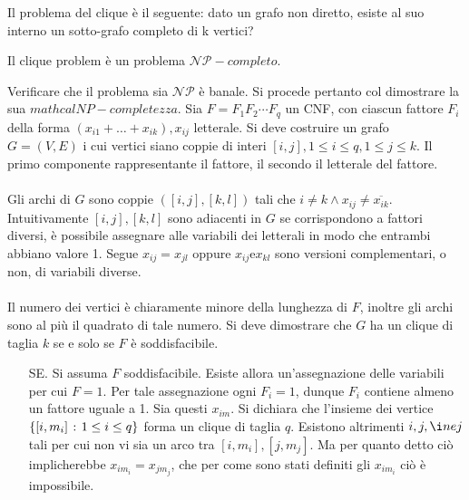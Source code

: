 \documentclass{subfiles}
\begin{document}
Il problema del clique è il seguente: dato un grafo non diretto, esiste al suo interno un sotto-grafo completo di k vertici?

\begin{Theorem}
    Il clique problem è un problema \(\mathcal{NP}-completo\).

    \begin{Proof*}
        Verificare che il problema sia \(\mathcal{NP}\) è banale.
        Si procede pertanto col dimostrare la sua \(mathcal{NP}-completezza\).
        Sia \(F = F_{1}F_{2} \cdots F_{q}\) un CNF, con ciascun fattore \(F_{i}\) della forma \((x_{i1} + \ldots + x_{ik}), x_{ij}\) letterale.
        Si deve costruire un grafo \(G = (V, E)\) i cui vertici siano coppie di interi \([i, j], 1 \le i \le q, 1 \le j \le k\).
        Il primo componente rappresentante il fattore, il secondo il letterale del fattore.
        \\ \\
        Gli archi di \(G\) sono coppie \(([i, j], [k, l])\) tali che \(i \ne k \land x_{ij} \ne \overline{x_{ik}}\).
        Intuitivamente \([i, j], [k, l]\) sono adiacenti in \(G\) se corrispondono a fattori diversi, è possibile assegnare alle variabili dei letterali in modo che entrambi abbiano valore 1.
        Segue \(x_{ij} = x_{jl}\) oppure \(x_{ij} \text{e} x_{kl}\) sono versioni complementari, o non, di variabili diverse.
        \\ \\
        Il numero dei vertici è chiaramente minore della lunghezza di \(F\), inoltre gli archi sono al più il quadrato di tale numero.
        Si deve dimostrare che \(G\) ha un clique di taglia \(k\) se e solo se \(F\) è soddisfacibile.

        \begin{itemize}
            \item [SE.] Si assuma \(F\) soddisfacibile. Esiste allora un'assegnazione delle variabili per cui \(F = 1\).
                  Per tale assegnazione ogni \(F_{i} = 1\), dunque \(F_{i}\) contiene almeno un fattore uguale a 1. Sia questi \(x_{im}\).
                  Si dichiara che l'insieme dei vertice \(\left\{[i, m_{i}] \operatorname{\: {:} \:} 1 \le i \le q\right\}\) forma un clique di taglia \(q\).
                  Esistono altrimenti \(i, j, \i ne j\) tali per cui non vi sia un arco tra \([i, m_{i}], [j, m_{j}]\).
                  Ma per quanto detto ciò implicherebbe \(x_{im_{i}} = x_{jm_{j}}\), che per come sono stati definiti gli \(x_{im_{i}}\) ciò è impossibile.


\end{itemize}
\end{Proof*}
\end{Theorem}
\end{document}
